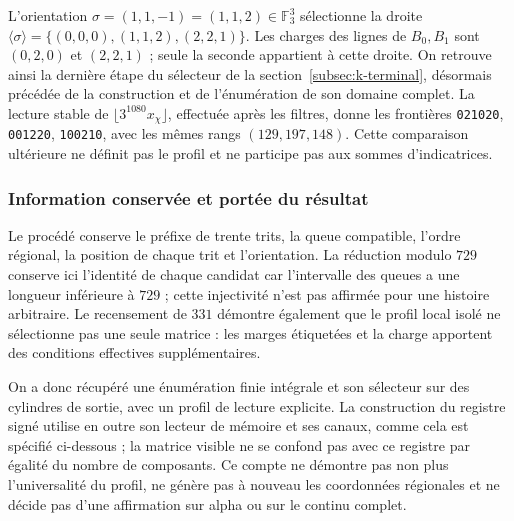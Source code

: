 L'orientation \(\sigma=(1,1,-1)=(1,1,2)\in\mathbb F_3^3\)
sélectionne la droite
\(\langle\sigma\rangle=\{(0,0,0),(1,1,2),(2,2,1)\}\).
Les charges des lignes de \(B_0,B_1\) sont \((0,2,0)\) et \((2,2,1)\) ;
seule la seconde appartient à cette droite. On retrouve ainsi la dernière étape
du sélecteur de la section~\ref{subsec:k-terminal}, désormais précédée de
la construction et de l'énumération de son domaine complet. La lecture stable
de \(\lfloor3^{1080}x_\chi\rfloor\), effectuée après les filtres,
donne les frontières \texttt{021020}, \texttt{001220}, \texttt{100210},
avec les mêmes rangs \((129,197,148)\). Cette comparaison ultérieure ne définit
pas le profil et ne participe pas aux sommes d'indicatrices.

\subsubsection{Information conservée et portée du résultat}

Le procédé conserve le préfixe de trente trits, la queue compatible, l'ordre régional, la position de chaque trit et l'orientation. La réduction modulo \(729\) conserve ici l'identité de chaque candidat car l'intervalle des queues a une longueur inférieure à \(729\) ; cette injectivité n'est pas affirmée pour une histoire arbitraire. Le recensement de \(331\) démontre également que le profil local isolé ne sélectionne pas une seule matrice : les marges étiquetées et la charge apportent des conditions effectives supplémentaires.

On a donc récupéré une énumération finie intégrale et son sélecteur sur des cylindres de sortie, avec un profil de lecture explicite. La construction du registre signé utilise en outre son lecteur de mémoire et ses canaux, comme cela est spécifié ci-dessous ; la matrice visible ne se confond pas avec ce registre par égalité du nombre de composants. Ce compte ne démontre pas non plus l'universalité du profil, ne génère pas à nouveau les coordonnées régionales et ne décide pas d'une affirmation sur alpha ou sur le continu complet.
